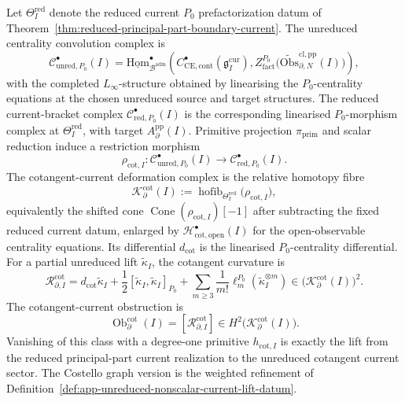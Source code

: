 \begin{defn}
	Let \(\Theta_I^{\mathrm{red}}\) denote the reduced current \(P_0\)
	prefactorization datum of
Theorem~\ref{thm:reduced-principal-part-boundary-current}.  The
unreduced centrality convolution complex is
\[
  \mathcal C^\bullet_{\mathrm{unred},P_0}(I)
  =
  \underline{\mathrm{Hom}}_{\mathcal B^{\mathrm{adm}}}^{\bullet}\!\left(
  C^\bullet_{\mathrm{CE},\mathrm{cont}}(\mathfrak g_I^{\mathrm{cur}}),
  Z^{P_0}_{\mathrm{fact}}\!
  \bigl(\widetilde{\mathrm{Obs}}^{\mathrm{cl,pp}}_{\partial,N}(I)\bigr)
  \right),
\]
with the completed \(L_\infty\)-structure obtained by linearising the
\(P_0\)-centrality equations at the chosen unreduced source and target
structures.  The reduced current-bracket complex
\(\mathcal C^\bullet_{\mathrm{red},P_0}(I)\) is the corresponding
linearised \(P_0\)-morphism complex at \(\Theta_I^{\mathrm{red}}\), with
target \(A^{\mathrm{pp}}_\partial(I)\).  Primitive projection
\(\pi_{\mathrm{prim}}\) and scalar reduction induce a restriction
morphism
\[
  \rho_{\mathrm{cot},I}\colon
  \mathcal C^\bullet_{\mathrm{unred},P_0}(I)
  \longrightarrow
  \mathcal C^\bullet_{\mathrm{red},P_0}(I).
\]
The cotangent-current deformation complex is the relative homotopy fibre
\[
  \mathcal K^{\mathrm{cot}}_\partial(I)
  :=
  \operatorname{hofib}_{\Theta_I^{\mathrm{red}}}
  \bigl(\rho_{\mathrm{cot},I}\bigr),
\]
	equivalently the shifted cone
	\(\operatorname{Cone}(\rho_{\mathrm{cot},I})[-1]\) after subtracting the
	fixed reduced current datum, enlarged by
	\(\mathcal H^\bullet_{\mathrm{cot,open}}(I)\) for the
	open-observable centrality equations.  Its differential
	\(d_{\mathrm{cot}}\) is the linearised \(P_0\)-centrality differential.
	For a partial unreduced
	lift \(\widetilde\kappa_I\), the cotangent curvature is
	\[
	  \mathcal R^{\mathrm{cot}}_{\partial,I}
  =
  d_{\mathrm{cot}}\widetilde\kappa_I
  +\frac12[\widetilde\kappa_I,\widetilde\kappa_I]_{P_0}
  +\sum_{m\ge3}\frac1{m!}
    \ell_m^{P_0}(\widetilde\kappa_I^{\otimes m})
  \in
  \bigl(\mathcal K^{\mathrm{cot}}_\partial(I)\bigr)^2 .
\]
The cotangent-current obstruction is
\[
  \operatorname{Ob}^{\mathrm{cot}}_\partial(I)
  =
  [\mathcal R^{\mathrm{cot}}_{\partial,I}]
  \in
  H^2\bigl(\mathcal K^{\mathrm{cot}}_\partial(I)\bigr).
\]
Vanishing of this class with a degree-one primitive
\(h_{\mathrm{cot},I}\) is exactly the lift from the reduced
principal-part current realization to the unreduced cotangent current
sector.  The Costello graph version is the weighted refinement of
Definition~\ref{def:app-unreduced-nonscalar-current-lift-datum}.
\end{defn}

